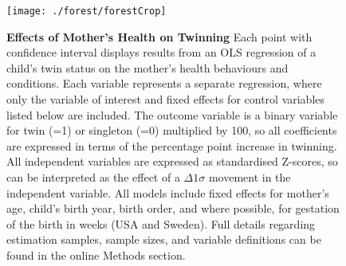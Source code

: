 \documentclass{nature}
\begin{document}
\begin{linenumbers}
\begin{spacing}{1}
\clearpage
\thispagestyle{empty}
\begin{spacing}{1}
\begin{figure}
\begin{center}
  \texttt{[image: ./forest/forestCrop]}
\end{center}
\caption{\textbf{Effects of Mother's Health on Twinning} {\footnotesize Each point with confidence interval displays results from an OLS regression of a child's twin status on the mother's health behaviours and conditions. Each variable represents a separate regression, where only the variable of interest and fixed effects for control variables listed below are included. The outcome variable is a binary variable for twin (=1) or singleton (=0) multiplied by 100, so all coefficients are expressed in terms of the percentage point increase in twinning.  All independent variables are expressed as standardised Z-scores, so can be interpreted as the effect of a $\Delta 1\sigma$ movement in the independent variable. All models include fixed effects for mother's age, child's birth year, birth order, and where possible, for gestation of the birth in weeks (USA and Sweden).  Full details regarding estimation samples, sample sizes, and variable definitions can be found in the online Methods section.}}
\label{fig:fullEsts}
\end{figure}
\end{spacing}




\clearpage
\thispagestyle{empty}




\end{spacing}
\end{linenumbers}
\end{document}

